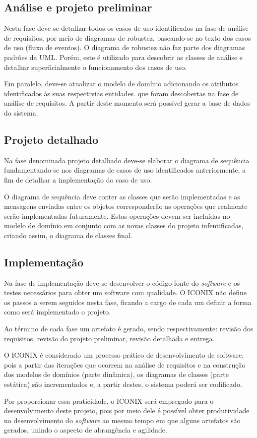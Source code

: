 \subsection{Análise e projeto preliminar}

Nesta fase deve-se detalhar todos os casos de uso identificados na fase de análise de requisitos, por meio de diagramas de robustez, baseando-se no texto dos casos de uso (fluxo de eventos). O diagrama de robustez não faz parte dos diagramas padrões da UML. Porém, este é utilizado para descobrir as classes de análise e detalhar superficialmente o funcionamento dos casos de uso.

Em paralelo, deve-se atualizar o modelo de domínio adicionando os atributos identificados às suas respectivias entidades. que foram descobertas na fase de análise de requisitos. A partir deste momento será possível gerar a base de dados do sistema.


\subsection{Projeto detalhado}

Na fase denominada projeto detalhado deve-se elaborar o diagrama de sequência fundamentando-se nos diagramas de casos de uso identificados anteriormente, a fim de detalhar a implementação do caso de uso.

O diagrama de sequência deve conter as classes que serão implementadas e as mensagens enviadas entre os objetos corresponderão as operações que realmente serão implementadas futuramente. Estas operações devem ser incluídas no modelo de domínio em conjunto com as novas classes do projeto infentificadas, criando assim, o diagrama de classes final.

\subsection{Implementação}

Na fase de implementação deve-se desenvolver o código fonte do \textit{software} e os testes necessários para obter um software com qualidade. O ICONIX não define os passos a serem seguidos nesta fase, ficando a cargo de cada um definir a forma como será implementado o projeto.
 
Ao término de cada fase um artefato é gerado, sendo respectivamente: revisão dos requisitos, revisão do projeto preliminar, revisão detalhada e entrega.

O ICONIX é considerado um processo prático de desenvolvimento de software, pois a partir das iterações que ocorrem na análise de requisitos e na construção dos modelos de domínios (parte dinâmica), os diagramas de classes (parte estática) são incrementados e, a partir destes, o sistema poderá ser codificado.


Por proporcionar essa praticidade, o ICONIX será empregado para o desenvolvimento deste projeto, pois por meio dele é possível obter produtividade no desenvolvimento do \textit{software} ao mesmo tempo em que alguns artefatos são gerados, unindo o aspecto de abrangência e agilidade.
